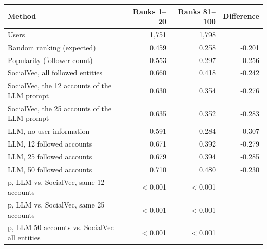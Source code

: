 \begin{tabular}{lrrr}
\toprule
Method & Ranks 1--20 & Ranks 81--100 & Difference \\
\midrule
Users & 1,751 & 1,798 &  \\
Random ranking (expected) & 0.459 & 0.258 & -0.201 \\
Popularity (follower count) & 0.553 & 0.297 & -0.256 \\
SocialVec, all followed entities & 0.660 & 0.418 & -0.242 \\
SocialVec, the 12 accounts of the LLM prompt & 0.630 & 0.354 & -0.276 \\
SocialVec, the 25 accounts of the LLM prompt & 0.635 & 0.352 & -0.283 \\
LLM, no user information & 0.591 & 0.284 & -0.307 \\
LLM, 12 followed accounts & 0.671 & 0.392 & -0.279 \\
LLM, 25 followed accounts & 0.679 & 0.394 & -0.285 \\
LLM, 50 followed accounts & 0.710 & 0.480 & -0.230 \\
p, LLM vs. SocialVec, same 12 accounts & \textless{} 0.001 & \textless{} 0.001 &  \\
p, LLM vs. SocialVec, same 25 accounts & \textless{} 0.001 & \textless{} 0.001 &  \\
p, LLM 50 accounts vs. SocialVec all entities & \textless{} 0.001 & \textless{} 0.001 &  \\
\bottomrule
\end{tabular}
